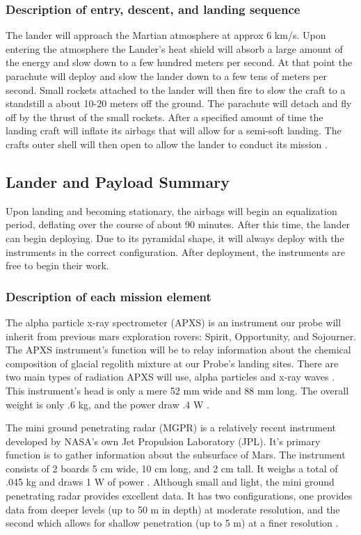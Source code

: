 \documentclass[%
 portrait,
 aapm,
 mph,%
 amsmath,amssymb,
 reprint,%
]{revtex4-2}
\begin{document}
\subsubsection{Description of entry, descent, and landing sequence}
The lander will approach the Martian atmosphere at approx 6 km/s.  Upon entering the atmosphere the Lander's heat shield will absorb a large amount of the energy and slow down to a few hundred meters per second.  At that point the parachute will deploy and slow the lander down to a few tens of meters per second.  Small rockets attached to the lander will then fire to slow the craft to a standstill a about 10-20 meters off the ground.  The parachute will detach and fly off by the thrust of the small rockets.  After a specified amount of time the landing craft will inflate its airbags that will allow for a semi-soft landing.  The crafts outer shell will then open to allow the lander to conduct its mission \cite{raiszadeh2011mars}. 
\subsection{Lander and Payload Summary}
Upon landing and becoming stationary, the airbags will begin an equalization period, deflating over the course of about 90 minutes. After this time, the lander can begin deploying. Due to its pyramidal shape, it will always deploy with the instruments in the correct configuration. After deployment, the instruments are free to begin their work.
\subsubsection{Description of each mission element}
The alpha particle x-ray spectrometer (APXS) is an instrument our probe will inherit from previous mars exploration rovers: Spirit, Opportunity, and Sojourner. The APXS instrument’s function will be to relay information about the chemical composition of glacial regolith mixture at our Probe’s landing sites. There are two main types of radiation APXS will use, alpha particles and x-ray waves \cite{APXS_NASA_Mars}. This instrument's head is only a mere 52 mm wide and 88 mm long. The overall weight is only .6 kg, and the power draw .4 W \cite{bruckner2003refined}. 

The mini ground penetrating radar (MGPR) is a relatively recent instrument developed by NASA's own Jet Propulsion Laboratory (JPL). It's primary function is to gather information about the subsurface of Mars. The instrument consists of 2 boards 5 cm wide, 10 cm long, and 2 cm tall. It weighs a total of .045 kg and draws 1 W of power \cite{kim2006miniature}. 
Although small and light, the mini ground penetrating radar provides excellent data. It has two configurations, one provides data from deeper levels (up to 50 m in depth) at moderate resolution, and the second which allows for shallow penetration (up to 5 m) at a finer resolution \cite{kim2012miniature}. 
\end{document}
